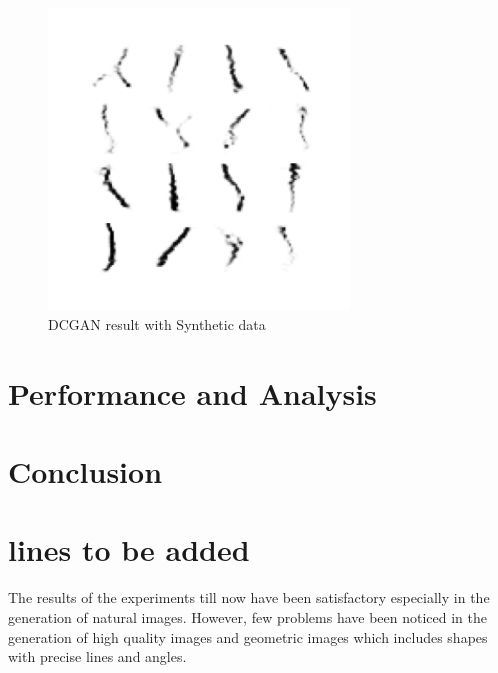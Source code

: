 \documentclass{article}
\begin{document}
\begin{figure}[H]
    \centering
    \includegraphics[width=8cm]{images/DCGANmodified.png}
    \caption{DCGAN result with Synthetic data}
\end{figure}

\section{Performance and Analysis}

 
\section{Conclusion}



\section{lines to be added}
The results of the experiments till now have been satisfactory especially in the generation of natural images. However, few problems have been noticed in the generation of high quality images and geometric images which includes shapes with precise lines and angles.
\end{document}
